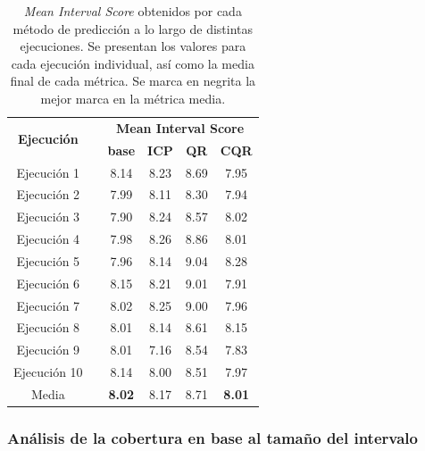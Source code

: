 \renewcommand{\arraystretch}{1.4}
\begin{table}[htbp]
    \small
    \centering
    \begin{tabular}{cccccc}
    \toprule
    \multirow{2}{*}{\textbf{Ejecución}} &  & \multicolumn{4}{c}{\textbf{Mean Interval Score}} \\ \cline{3-6} 
    &  & \textbf{base} & \textbf{ICP} & \textbf{QR} & \textbf{CQR} \\ \cline{1-1} \cline{3-6} 
    Ejecución  1 &  & 8.14 & 8.23 & 8.69 & 7.95 \\
    Ejecución  2 &  & 7.99 & 8.11 & 8.30 & 7.94 \\
    Ejecución  3 &  & 7.90 & 8.24 & 8.57 & 8.02 \\
    Ejecución  4 &  & 7.98 & 8.26 & 8.86 & 8.01 \\
    Ejecución  5 &  & 7.96 & 8.14 & 9.04 & 8.28 \\
    Ejecución  6 &  & 8.15 & 8.21 & 9.01 & 7.91 \\
    Ejecución  7 &  & 8.02 & 8.25 & 9.00 & 7.96 \\
    Ejecución  8 &  & 8.01 & 8.14 & 8.61 & 8.15 \\
    Ejecución  9 &  & 8.01 & 7.16 & 8.54 & 7.83 \\
    Ejecución 10 &  & 8.14 & 8.00 & 8.51 & 7.97 \\ \cline{1-1} \cline{3-6} 
    Media        &  & \textbf{8.02} & 8.17 & 8.71 & \textbf{8.01} \\ 
    \bottomrule
    \end{tabular}
    \caption[
        Problema de estimación de edad: 
        \textit{Mean Interval Score} obtenidos por cada método de predicción a lo largo de distintas ejecuciones. 
    ]{   
        \textit{Mean Interval Score} obtenidos por cada método de predicción a lo largo de distintas ejecuciones. Se presentan los valores para cada ejecución individual, así como la media final de cada métrica.
        Se marca en negrita la mejor marca en la métrica media.
    }
    \label{tab:AE_MIS_comparative}
\end{table}


\subsubsection{Análisis de la cobertura en base al tamaño del intervalo}

